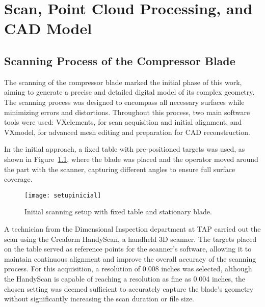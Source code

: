 
%


\chapter{Scan, Point Cloud Processing, and CAD Model}
\label{cha:digi}


\section{Scanning Process of the Compressor Blade}
\label{sec:scan}

The scanning of the compressor blade marked the initial phase of this work, aiming to generate a precise and detailed digital model of its complex geometry.
The scanning process was designed to encompass all necessary surfaces while minimizing errors and distortions.
Throughout this process, two main software tools were used: VXelements, for scan acquisition and initial alignment, and VXmodel, for advanced mesh editing and preparation for CAD reconstruction.

In the initial approach, a fixed table with pre-positioned targets was used, as shown in Figure~\ref{fig:setupinicial}, where the blade was placed and the operator moved around the part with the scanner, capturing different angles to ensure full surface coverage.

\begin{figure}[H]
    \centering
    \texttt{[image: setupinicial]}
    \caption{Initial scanning setup with fixed table and stationary blade.}
    \label{fig:setupinicial}
\end{figure}


A technician from the Dimensional Inspection department at \gls{TAP} carried out the scan using the Creaform HandyScan, a handheld 3D scanner. 
The targets placed on the table served as reference points for the scanner's software, allowing it to maintain continuous alignment and improve the overall accuracy of the scanning process.
For this acquisition, a resolution of 0.008 inches was selected, although the HandyScan is capable of reaching a resolution as fine as 0.004 inches, the chosen setting was deemed sufficient to accurately capture the blade’s geometry without significantly increasing the scan duration or file size.

